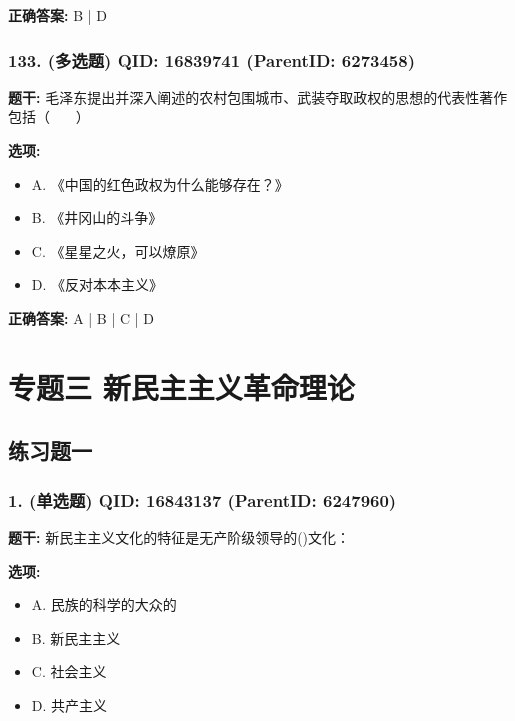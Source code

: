 \documentclass[12pt,UTF8]{ctexart}
\begin{document}
\textbf{正确答案:}
B | D

\vspace{0.3em}\hrulefill\vspace{0.7em}

\subsubsection*{133. (多选题) \small QID: 16839741 (ParentID: 6273458)}

\textbf{题干:}
毛泽东提出并深入阐述的农村包围城市、武装夺取政权的思想的代表性著作包括（    ）



\textbf{选项:}
\begin{itemize}[leftmargin=*]

  \item A. 《中国的红色政权为什么能够存在？》

  \item B. 《井冈山的斗争》

  \item C. 《星星之火，可以燎原》

  \item D. 《反对本本主义》

\end{itemize}

\textbf{正确答案:}
A | B | C | D

\vspace{0.3em}\hrulefill\vspace{0.7em}

\section*{专题三 新民主主义革命理论}
\hrulefill

\subsection*{练习题一}

\subsubsection*{1. (单选题) \small QID: 16843137 (ParentID: 6247960)}

\textbf{题干:}
新民主主义文化的特征是无产阶级领导的()文化：



\textbf{选项:}
\begin{itemize}[leftmargin=*]

  \item A. 民族的科学的大众的

  \item B. 新民主主义

  \item C. 社会主义

  \item D. 共产主义

\end{itemize}
\end{document}
